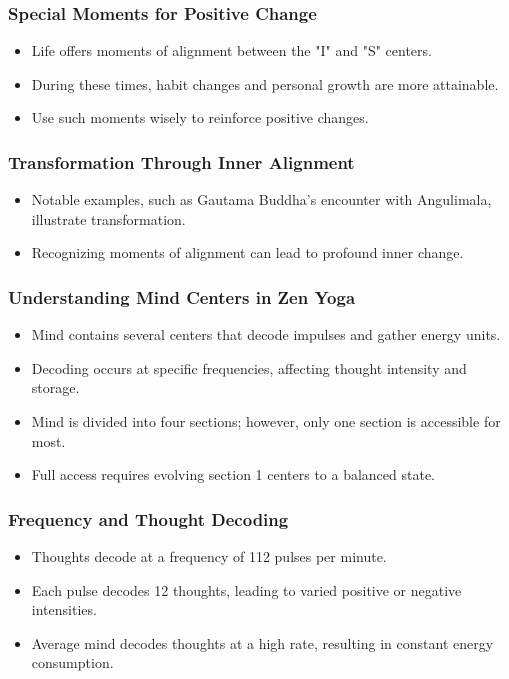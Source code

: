 \begin{frame}[fragile]\frametitle{Special Moments for Positive Change}
    \begin{itemize}
        \item Life offers moments of alignment between the "I" and "S" centers.
        \item During these times, habit changes and personal growth are more attainable.
        \item Use such moments wisely to reinforce positive changes.
    \end{itemize}
\end{frame}

\begin{frame}[fragile]\frametitle{Transformation Through Inner Alignment}
    \begin{itemize}
        \item Notable examples, such as Gautama Buddha’s encounter with Angulimala, illustrate transformation.
        \item Recognizing moments of alignment can lead to profound inner change.
    \end{itemize}
\end{frame}



\begin{frame}[fragile]\frametitle{Understanding Mind Centers in Zen Yoga}
    \begin{itemize}
        \item Mind contains several centers that decode impulses and gather energy units.
        \item Decoding occurs at specific frequencies, affecting thought intensity and storage.
        \item Mind is divided into four sections; however, only one section is accessible for most.
        \item Full access requires evolving section 1 centers to a balanced state.
    \end{itemize}
\end{frame}

\begin{frame}[fragile]\frametitle{Frequency and Thought Decoding}
    \begin{itemize}
        \item Thoughts decode at a frequency of 112 pulses per minute.
        \item Each pulse decodes 12 thoughts, leading to varied positive or negative intensities.
        \item Average mind decodes thoughts at a high rate, resulting in constant energy consumption.
    \end{itemize}
\end{frame}

